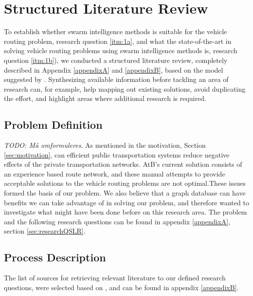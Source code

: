 \section{Structured Literature Review}
To establish whether swarm intelligence methods is suitable for the vehicle routing problem, research question \ref{itm:1a}, and what the state-of-the-art in solving vehicle routing problems using swarm intelligence methods is, research question \ref{itm:1b}), we conducted a structured literature review, completely described in Appendix \vref{appendixA} and \vref{appendixB}, based on the model suggested by \citet{kofod2014}. Synthesizing available information before tackling an area of research can, for example, help mapping out existing solutions, avoid duplicating the effort, and highlight areas where additional research is required\citep{kofod2014}. 

\subsection{Problem Definition}
\emph{\color{blue} TODO: Må omformuleres}. 
As mentioned in the motivation, Section \vref{sec:motivation}, can efficient public transportation systems reduce negative effects of the private transportation networks. AtB's current solution consists of an experience based route network, and these manual attempts to provide acceptable solutions to the vehicle routing problems are not optimal.These issues formed the basis of our problem. We also believe that a graph database can have benefits we can take advantage of in solving our problem, and therefore wanted to investigate what might have been done before on this research area. The problem and the following research questions can be found in appendix \ref{appendixA}, section \vref{sec:researchQSLR}. 

\subsection{Process Description}
The list of sources for retrieving relevant literature to our defined research questions, were selected based on \citep[p.3]{kofod2014}, and can be found in appendix \vref{appendixB}. 

